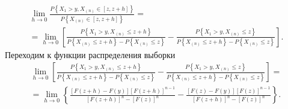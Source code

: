 \begin{equation*}
  \begin{split}
    \lim \limits_{h \to 0}
      \frac{P \left\{ X_1 > y, X_{ \left( n \right) } \in \left[ z, z + h \right] \right\} }{P \left\{ X_{ \left( n \right) } \in \left[ z, z + h \right] \right\} } = \\
    = \lim \limits_{h \to 0} \left[
      \frac{P \left\{ X_1 > y, X_{ \left( n \right) } \leq z + h \right\} }{P \left\{ X_{ \left( n \right) } \leq z + h \right\} - P \left\{ X_{ \left( n \right) } \leq z \right\} } -
      \frac{P \left\{ X_1 > y, X_{ \left( n \right) } \leq z \right\} }{P \left\{ X_{ \left( n \right) } \leq z + h \right\} - P \left\{ X_{ \left( n \right) } \leq z \right\} }
    \right].
  \end{split}
\end{equation*}
Переходим к функции распределения выборки
\begin{equation*}
  \begin{split}
    \lim \limits_{h \to 0} \left[
      \frac{P \left\{ X_1 > y, X_{ \left( n \right) } \leq z + h \right\} }{P \left\{ X_{ \left( n \right) } \leq z + h \right\} - P \left\{ X_{ \left( n \right) } \leq z \right\} } -
      \frac{P \left\{ X_1 > y, X_{ \left( n \right) } \leq z \right\} }{P \left\{ X_{ \left( n \right) } \leq z + h \right\} - P \left\{ X_{ \left( n \right) } \leq z \right\} }
    \right] = \\
    = \lim \limits_{h \to 0} \left\{
      \frac{ \left[ F \left( z + h \right) - F \left( y \right) \right] \left[ F \left( z + h \right) \right]^{n - 1}}{ \left[ F \left( z + h \right) \right]^n - \left[ F \left( z \right) \right]^n} -
      \frac{ \left[ F \left( z \right) - F \left( y \right) \right] \left[ F \left( z \right) \right]^{n - 1}}{ \left[ F \left( z + h \right) \right]^n - \left[ F \left( z \right) \right]^n}
    \right\}.
  \end{split}
\end{equation*}

